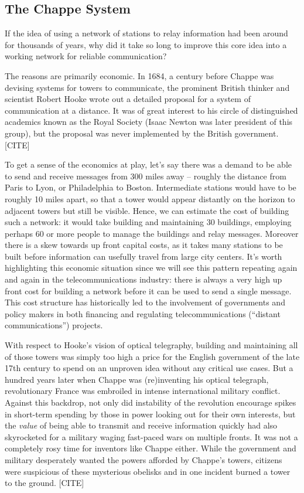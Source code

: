\documentclass[UTF8]{book}
\begin{document}
\begin{CJK}{UTF8}{gbsn}
\subsection{The Chappe System}

If the idea of using a network of stations to relay information had been around for thousands of years, why did it take so long to improve this core idea into a working network for reliable communication?

The reasons are primarily economic. In 1684, a century before Chappe was devising systems for towers to communicate, the prominent British thinker and scientist Robert Hooke wrote out a detailed proposal for a system of communication at a distance. It was of great interest to his circle of distinguished academics known as the Royal Society (Isaac Newton was later president of this group), but the proposal was never implemented by the British government. [CITE]

To get a sense of the economics at play, let's say there was a demand to be able to send and receive messages from 300 miles away -- roughly the distance from Paris to Lyon, or Philadelphia to Boston. Intermediate stations would have to be roughly 10 miles apart, so that a tower would appear distantly on the horizon to adjacent towers but still be visible. Hence, we can estimate the cost of building such a network: it would take building and maintaining 30 buildings, employing perhaps 60 or more people to manage the buildings and relay messages. Moreover there is a skew towards up front capital costs, as it takes many stations to be built before information can usefully travel from large city centers. It's worth highlighting this economic situation since we will see this pattern repeating again and again in the telecommunications industry: there is always a very high up front cost for building a network before it can be used to send a single message. This cost structure has historically led to the involvement of governments and policy makers in both financing and regulating telecommunications (``distant communications'') projects.

With respect to Hooke's vision of optical telegraphy, building and maintaining all of those towers was simply too high a price for the English government of the late 17th century to spend on an unproven idea without any critical use cases. But a hundred years later when Chappe was (re)inventing his optical telegraph, revolutionary France was embroiled in intense international military conflict. Against this backdrop, not only did instability of the revolution encourage spikes in short-term spending by those in power looking out for their own interests, but the \emph{value} of being able to transmit and receive information quickly had also skyrocketed for a military waging fast-paced wars on multiple fronts. It was not a completely rosy time for inventors like Chappe either. While the government and military desperately wanted the powers afforded by Chappe's towers, citizens were suspicious of these mysterious obelisks and in one incident burned a tower to the ground. [CITE]


\end{CJK}
\end{document}
